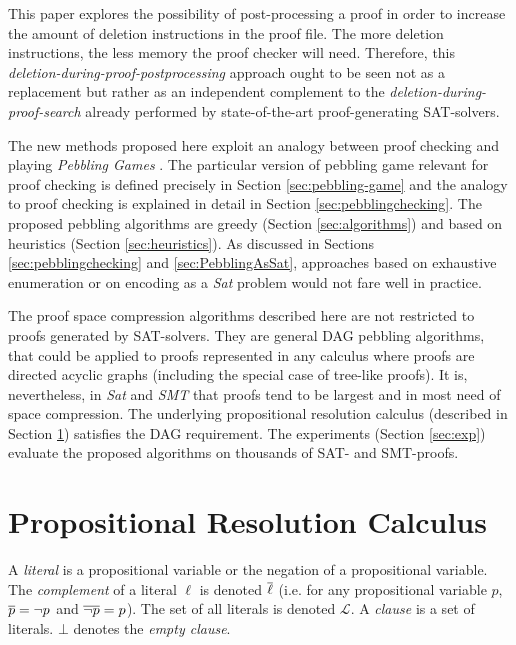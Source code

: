 \documentclass{llncs}
\begin{document}
This paper explores the possibility of post-processing a proof in order to increase the amount of deletion instructions in the proof file. The more deletion instructions, the less memory the proof checker will need. Therefore, this \emph{deletion-during-proof-postprocessing} approach ought to be seen not as a replacement but rather as an independent complement to the \emph{deletion-during-proof-search} already performed by state-of-the-art proof-generating SAT-solvers.

The new methods proposed here exploit an analogy between proof checking and 
playing \emph{Pebbling Games} \cite{kasai1979classes,gilbert1980pebbling}. 
The particular version of pebbling game relevant for proof checking is defined precisely in Section \ref{sec:pebbling-game} and the analogy to proof checking is explained in detail in Section \ref{sec:pebblingchecking}. The proposed pebbling algorithms are greedy (Section \ref{sec:algorithms}) and based on heuristics (Section \ref{sec:heuristics}). As discussed in Sections \ref{sec:pebblingchecking} and \ref{sec:PebblingAsSat}, approaches based on exhaustive enumeration or on encoding as a \emph{Sat} problem would not fare well in practice.

The proof space compression algorithms described here are not restricted to proofs generated by SAT-solvers. They are general DAG pebbling algorithms, that could be applied to proofs represented in any calculus where proofs are directed acyclic graphs (including the special case of tree-like proofs). It is, nevertheless, in \emph{Sat} and \emph{SMT} that proofs tend to be largest and in most need of space compression. The underlying propositional resolution calculus (described in Section \ref{sec:Resolution}) satisfies the DAG requirement. The experiments (Section \ref{sec:exp}) evaluate the proposed algorithms on thousands of SAT- and SMT-proofs.


\section{Propositional Resolution Calculus}
\label{sec:Resolution}

A \emph{literal} is a propositional variable or the negation of a propositional variable. The
\emph{complement} of a literal $\ell$ is denoted $\overline{\ell}$ (i.e. for any propositional variable $p$,
$\overline{p} = \neg p$ and $\overline{\neg p} = p$). The set of all literals is denoted $\mathcal{L}$. A
\emph{clause} is a set of literals. $\bot$ denotes the \emph{empty clause}.
\end{document}
